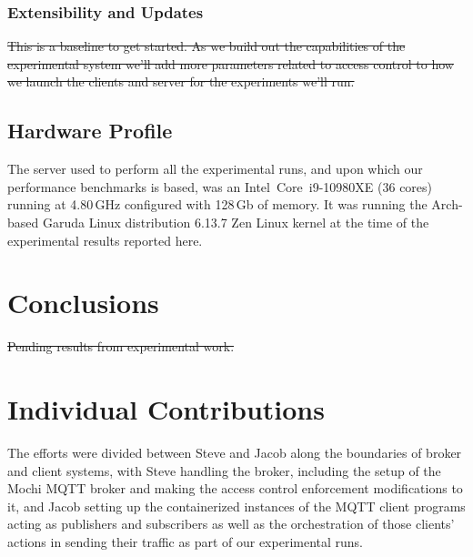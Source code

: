 \documentclass[sigconf, nonacm]{acmart}
\begin{document}
\subsubsection{Extensibility and Updates}
\sout{This is a baseline to get started. As we build out the capabilities of the experimental system we'll add more parameters related to access control to how we launch the clients and server for the experiments we'll run.}

\subsection{Hardware Profile}
The server used to perform all the experimental runs, and upon which our performance benchmarks is based, was an Intel\textregistered\ Core\texttrademark\ i9-10980XE (36 cores) running at 4.80\,GHz configured with 128\,Gb of memory.
It was running the Arch-based Garuda Linux distribution 6.13.7 Zen Linux kernel at the time of the experimental results reported here.
\section{Conclusions}
\sout{Pending results from experimental work.}
\section{Individual Contributions}
The efforts were divided between Steve and Jacob along the boundaries of broker and client systems,
with Steve handling the broker, including the setup of the Mochi MQTT broker and making the access
control enforcement modifications to it, and Jacob setting up the containerized instances of
the MQTT client programs acting as publishers and subscribers as well as the orchestration of
those clients' actions in sending their traffic as part of our experimental runs.

%

\end{document}
